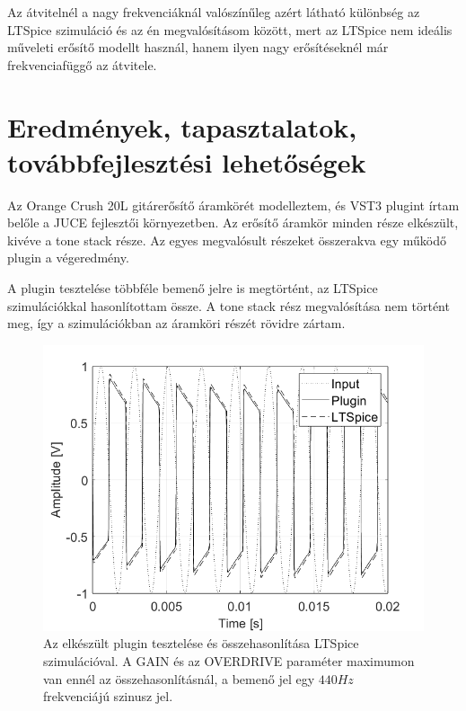 Az átvitelnél a nagy frekvenciáknál valószínűleg azért látható különbség az LTSpice szimuláció és az én megvalósításom között, mert az LTSpice nem ideális műveleti erősítő modellt használ, hanem ilyen nagy erősítéseknél már frekvenciafüggő az átvitele. 

\chapter{Eredmények, tapasztalatok, továbbfejlesztési lehetőségek}
Az Orange Crush 20L gitárerősítő áramkörét modelleztem, és VST3 plugint írtam belőle a JUCE fejlesztői környezetben. Az erősítő áramkör minden része elkészült, kivéve a tone stack része. Az egyes megvalósult részeket összerakva egy működő plugin a végeredmény.

A plugin tesztelése többféle bemenő jelre is megtörtént, az LTSpice szimulációkkal hasonlítottam össze. A tone stack rész megvalósítása nem történt meg, így a szimulációkban az áramköri részét rövidre zártam. 
\begin{figure}[H]
    \centering
    \includegraphics[scale=0.5]{figures/final.png}
    \caption{Az elkészült plugin tesztelése és összehasonlítása LTSpice szimulációval. A GAIN és az OVERDRIVE paraméter maximumon van ennél az összehasonlításnál, a bemenő jel egy $440Hz$ frekvenciájú szinusz jel.}
\end{figure}

